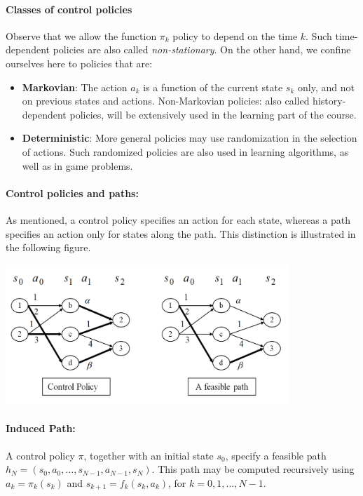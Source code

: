 \paragraph{Classes of control policies}
Observe that we allow the function ${\pi _k}$ policy to depend on the time $k$. Such time-dependent policies are also called \emph{non-stationary}. On the other hand, we confine ourselves here to policies that are:
\begin{itemize}
  \item \textbf{Markovian}: The action ${a_k}$ is a function of the current state ${s_k}$ only, and not on previous states and actions. Non-Markovian policies: also called history-dependent policies, will be extensively used in the learning part of the course.
  \item \textbf{Deterministic}: More general policies may use randomization in the selection of actions. Such randomized policies are also used in learning algorithms, as well as in game problems.
\end{itemize}

\paragraph{Control policies and paths:} As mentioned, a control policy specifies an action for each state, whereas a path specifies an action only for states along the path. This distinction is illustrated in the following figure.

\begin{centering}
\includegraphics[width=0.8\textwidth]{lecture2_policy_path}\\
\end{centering}

\paragraph{Induced Path:} A control policy $\pi $, together with an initial state ${s_0}$, specify a feasible path ${h_N} = ({s_0},{a_0}, \ldots ,{s_{N - 1}},{a_{N - 1}},{s_N})$. This path may be computed recursively using ${a_k} = {\pi _k}({s_k})$ and ${s_{k + 1}} = {f_k}({s_k},{a_k})$, for $k = 0,1, \ldots ,N - 1$.

